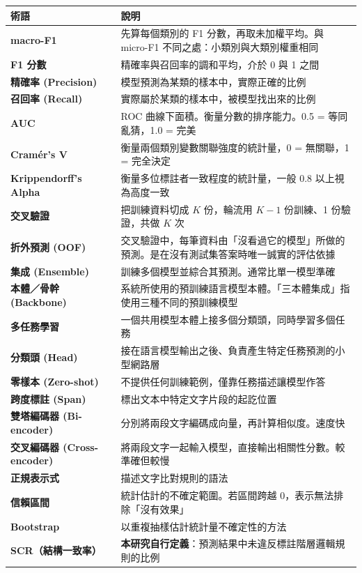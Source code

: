 \documentclass[11pt,a4paper]{ctexart}
\begin{document}
\begin{longtable}{@{}p{4.2cm}p{10.5cm}@{}}
\toprule
術語 & 說明 \\
\midrule
\endhead
\textbf{macro-F1} & 先算每個類別的 F1 分數，再取未加權平均。與 micro-F1 不同之處：小類別與大類別權重相同 \\
\textbf{F1 分數} & 精確率與召回率的調和平均，介於 0 與 1 之間 \\
\textbf{精確率 (Precision)} & 模型預測為某類的樣本中，實際正確的比例 \\
\textbf{召回率 (Recall)} & 實際屬於某類的樣本中，被模型找出來的比例 \\
\textbf{AUC} & ROC 曲線下面積。衡量分數的排序能力。0.5 = 等同亂猜，1.0 = 完美 \\
\textbf{Cramér's V} & 衡量兩個類別變數關聯強度的統計量，0 = 無關聯，1 = 完全決定 \\
\textbf{Krippendorff's Alpha} & 衡量多位標註者一致程度的統計量，一般 0.8 以上視為高度一致 \\
\textbf{交叉驗證} & 把訓練資料切成 $K$ 份，輪流用 $K-1$ 份訓練、1 份驗證，共做 $K$ 次 \\
\textbf{折外預測 (OOF)} & 交叉驗證中，每筆資料由「沒看過它的模型」所做的預測。是在沒有測試集答案時唯一誠實的評估依據 \\
\textbf{集成 (Ensemble)} & 訓練多個模型並綜合其預測。通常比單一模型準確 \\
\textbf{本體／骨幹 (Backbone)} & 系統所使用的預訓練語言模型本體。「三本體集成」指使用三種不同的預訓練模型 \\
\textbf{多任務學習} & 一個共用模型本體上接多個分類頭，同時學習多個任務 \\
\textbf{分類頭 (Head)} & 接在語言模型輸出之後、負責產生特定任務預測的小型網路層 \\
\textbf{零樣本 (Zero-shot)} & 不提供任何訓練範例，僅靠任務描述讓模型作答 \\
\textbf{跨度標註 (Span)} & 標出文本中特定文字片段的起訖位置 \\
\textbf{雙塔編碼器 (Bi-encoder)} & 分別將兩段文字編碼成向量，再計算相似度。速度快 \\
\textbf{交叉編碼器 (Cross-encoder)} & 將兩段文字一起輸入模型，直接輸出相關性分數。較準確但較慢 \\
\textbf{正規表示式} & 描述文字比對規則的語法 \\
\textbf{信賴區間} & 統計估計的不確定範圍。若區間跨越 0，表示無法排除「沒有效果」 \\
\textbf{Bootstrap} & 以重複抽樣估計統計量不確定性的方法 \\
\textbf{SCR（結構一致率）} & \textbf{本研究自行定義}：預測結果中未違反標註階層邏輯規則的比例 \\
\bottomrule
\end{longtable}
\end{document}
